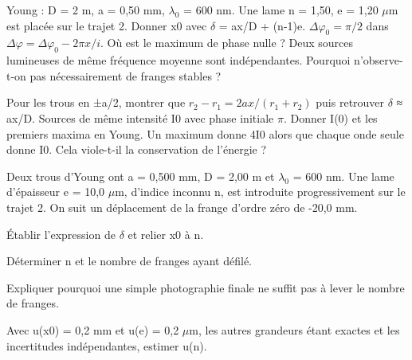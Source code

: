 Young : D = 2 m, a = 0,50 mm, \ensuremath{\lambda_0} = 600 nm. Une lame n = 1,50, e = 1,20 \ensuremath{\mu}m est placée sur le trajet 2. Donner x0 avec \ensuremath{\delta} = ax/D + (n-1)e.
$\Delta\varphi_0=\pi/2$ dans $\Delta\varphi=\Delta\varphi_0-2\pi x/i$. Où est le maximum de phase nulle ?
Deux sources lumineuses de même fréquence moyenne sont indépendantes. Pourquoi n’observe-t-on pas nécessairement de franges stables ?


Pour les trous en ±a/2, montrer que $r_2-r_1=2ax/(r_1+r_2)$ puis retrouver \ensuremath{\delta} ≈ ax/D.
Sources de même intensité I0 avec phase initiale \ensuremath{\pi}. Donner I(0) et les premiers maxima en Young.
Un maximum donne 4I0 alors que chaque onde seule donne I0. Cela viole-t-il la conservation de l’énergie ?


\label{ex-D1}
Deux trous d’Young ont a = 0,500 mm, D = 2,00 m et \ensuremath{\lambda_0} = 600 nm. Une lame d’épaisseur e = 10,0 \ensuremath{\mu}m, d’indice inconnu n, est introduite progressivement sur le trajet 2. On suit un déplacement de la frange d’ordre zéro de -20,0 mm.\begin{questions}
\item Établir l’expression de \ensuremath{\delta} et relier x0 à n.
\item Déterminer n et le nombre de franges ayant défilé.
\item Expliquer pourquoi une simple photographie finale ne suffit pas à lever le nombre de franges.
\item Avec u(x0) = 0,2 mm et u(e) = 0,2 \ensuremath{\mu}m, les autres grandeurs étant exactes et les incertitudes indépendantes, estimer u(n).
\end{questions}


